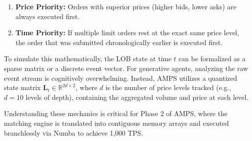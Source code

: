 \begin{enumerate}
    \item \textbf{Price Priority:} Orders with superior prices (higher bids, lower asks) are always executed first.
    \item \textbf{Time Priority:} If multiple limit orders rest at the exact same price level, the order that was submitted chronologically earlier is executed first.
\end{enumerate}

To simulate this mathematically, the LOB state at time $t$ can be formalized as a sparse matrix or a discrete event vector. For generative agents, analyzing the raw event stream is cognitively overwhelming. Instead, AMPS utilizes a quantized state matrix $\mathbf{L}_t \in \mathbb{R}^{2d \times 2}$, where $d$ is the number of price levels tracked (e.g., $d=10$ levels of depth), containing the aggregated volume and price at each level.

Understanding these mechanics is critical for Phase 2 of AMPS, where the matching engine is translated into contiguous memory arrays and executed branchlessly via Numba to achieve 1,000 TPS.

